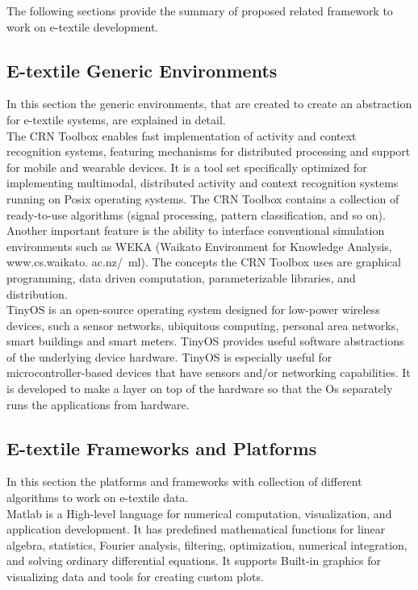 The following sections provide the summary of proposed related framework to work on e-textile development.

\subsection{E-textile Generic Environments}

In this section the generic environments, that are created to create an abstraction for e-textile systems, are explained in detail. \\ 

The CRN Toolbox enables fast implementation of activity and context recognition systems, featuring mechanisms for distributed processing and support for mobile and wearable devices. It is a tool set specifically optimized for implementing multimodal, distributed activity and context recognition systems running on Posix operating systems. The CRN Toolbox contains a collection of ready-to-use algorithms (signal processing, pattern classification, and so on). Another important feature is the ability to interface conventional simulation environments such as WEKA (Waikato Environment for Knowledge Analysis, www.cs.waikato. ac.nz/~ml). The concepts the CRN Toolbox uses are graphical programming, data driven computation, parameterizable libraries, and distribution. \\

TinyOS is an open-source operating system designed for low-power wireless devices, such a sensor networks, ubiquitous computing, personal area networks, smart buildings and smart meters. TinyOS provides useful software abstractions of the underlying device hardware. TinyOS is especially useful for microcontroller-based devices that have sensors and/or networking capabilities. It is developed to make a layer on top of the hardware so that the Os separately runs the applications from hardware.


\subsection{E-textile Frameworks and Platforms}
In this section the platforms and frameworks with collection of different algorithms to work on e-textile data.\\

Matlab is a High-level language for numerical computation, visualization, and application development. It has predefined mathematical functions for linear algebra, statistics, Fourier analysis, filtering, optimization, numerical integration, and solving ordinary differential equations. It supports Built-in graphics for visualizing data and tools for creating custom plots. \\

